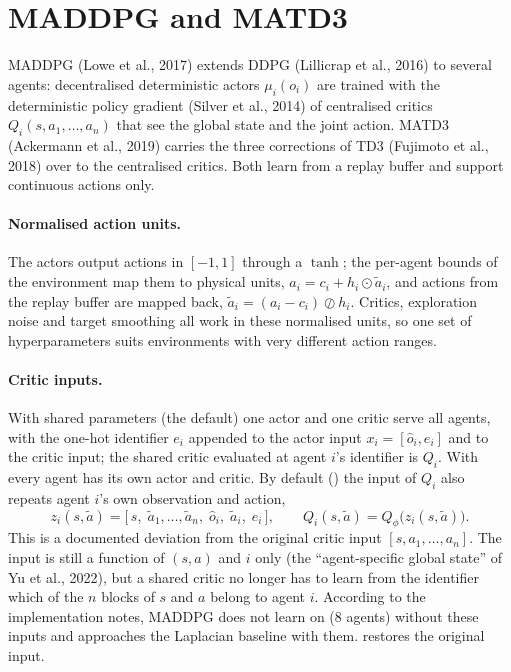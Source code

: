 \section{MADDPG and MATD3}\label{sec:marl-ddpg}

MADDPG (Lowe et al., 2017) extends DDPG (Lillicrap et al., 2016) to several
agents: decentralised deterministic actors $\mu_i(o_i)$ are trained with the
deterministic policy gradient (Silver et al., 2014) of centralised critics
$Q_i(s, a_1, \dots, a_n)$ that see the global state and the joint action.
MATD3 (Ackermann et al., 2019) carries the three corrections of TD3
(Fujimoto et al., 2018) over to the centralised critics. Both learn from a
replay buffer and support continuous actions only.

\paragraph{Normalised action units.} The actors output actions in $[-1, 1]$
through a $\tanh$; the per-agent bounds of the environment map them to
physical units, $a_i = c_i + h_i \odot \tilde a_i$, and actions from the
replay buffer are mapped back, $\tilde a_i = (a_i - c_i) \oslash h_i$. Critics,
exploration noise and target smoothing all work in these normalised units, so
one set of hyperparameters suits environments with very different action
ranges.

\paragraph{Critic inputs.} With shared parameters (the default) one actor and
one critic serve all agents, with the one-hot identifier $e_i$ appended to the
actor input $x_i = [\hat o_i, e_i]$ and to the critic input; the shared critic
evaluated at agent $i$'s identifier is $Q_i$. With 
every agent has its own actor and critic. By default
() the input of $Q_i$ also repeats agent $i$'s
own observation and action,
\begin{equation}
  z_i(s, \tilde a) = \bigl[\,s,\; \tilde a_1, \dots, \tilde a_n,\; \hat o_i,\;
    \tilde a_i,\; e_i\,\bigr], \qquad Q_i(s, \tilde a) = Q_\phi\bigl(z_i(s, \tilde a)\bigr).
  \label{eq:marl-critic-input}
\end{equation}
This is a documented deviation from the original critic input
$[s, a_1, \dots, a_n]$. The input is still a function of $(s, a)$ and $i$ only
(the ``agent-specific global state'' of Yu et al., 2022), but a shared critic
no longer has to learn from the identifier which of the $n$ blocks of $s$ and
$a$ belong to agent $i$. According to the implementation notes, MADDPG does not
learn on  (8 agents) without these inputs and approaches
the Laplacian baseline with them.  restores
the original input.

